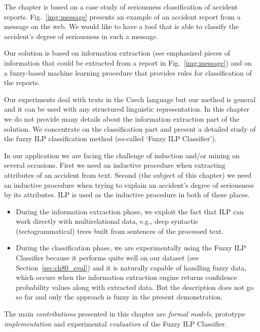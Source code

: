 The chapter is based on a case study of seriousness classification of accident reports. Fig.~\ref{img:message} presents an example of an accident report from a message on the web. We would like to have a tool that is able to classify the accident's degree of seriousness in such a message.

Our solution is based on information extraction (see emphasized pieces of information that could be extracted from a report in Fig.~\ref{img:message}) and on a fuzzy-based machine learning procedure that provides rules for classification of the reports.

Our experiments deal with texts in the Czech language but our method is general and it can be used with any structured linguistic representation. In this chapter we do not provide many details about the information extraction part of the solution. We concentrate on the classification part and present a detailed study of the fuzzy ILP classification method (so-called `Fuzzy ILP Classifier'). 

In our application we are facing the challenge of induction and/or mining on several occasions. First we need an inductive procedure when extracting attributes of an accident from text. Second (the subject of this chapter) we need an inductive procedure when trying to explain an accident's degree of seriousness by its attributes. ILP is used as the inductive procedure in both of these places.
\begin{itemize}
	\item During the information extraction phase, we exploit the fact that ILP can work directly with multirelational data, e.g., deep syntactic (tectogrammatical) trees built from sentences of the processed text.
	\item During the classification phase, we are experimentally using the Fuzzy ILP Classifier because it performs quite well on our dataset (see Section~\ref{sec:ch80_eval}) and it is naturally capable of handling fuzzy data, which occurs when the information extraction engine returns confidence probability values along with extracted data. But the description does not go so far and only the approach is fuzzy in the present demonstration.
\end{itemize}

The main \emph{contributions} presented in this chapter are \emph{formal models}, prototype \emph{implementation} and experimental \emph{evaluation} of the Fuzzy ILP Classifier.
\medskip

